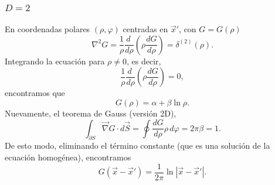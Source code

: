 \subsubsection{$D=2$}
En coordenadas polares $(\rho,\varphi)$ centradas en $\vec{x}'$, con $G=G(\rho)$
\begin{equation}
\nabla^2G=\frac{1}{\rho}\frac{d\ }{d\rho}\left(\rho\frac{dG}{d\rho}\right)=\delta^{(2)}(\rho).
\end{equation}
Integrando la ecuación para $\rho\neq 0$, es decir,
\begin{equation}
\frac{1}{\rho}\frac{d\ }{d\rho}\left(\rho\frac{dG}{d\rho}\right)=0,
\end{equation}
encontramos que
\begin{equation}
G(\rho)=\alpha+\beta\ln\rho.
\end{equation}
Nuevamente, el teorema de Gauss (versión 2D), 
\begin{equation}
\int_{\partial S}\vec\nabla G\cdot d\vec{S}=\oint\frac{dG}{d\rho}\rho\,d\varphi=2\pi\beta=1.
\end{equation}
De esto modo, eliminando el término constante (que es una solución de la ecuación homogénea), encontramos
\begin{equation}
\boxed{G(\vec{x}-\vec{x}')=\frac{1}{2\pi}\ln{|\vec{x}-\vec{x}'|}.}
\end{equation}


